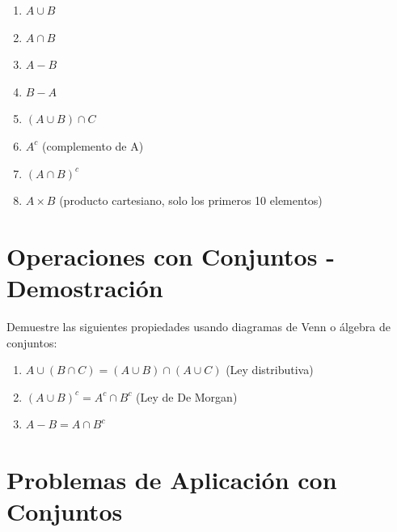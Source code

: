 \documentclass[12pt,a4paper]{article}
\begin{document}
\begin{enumerate}
    \item $A \cup B$
    \item $A \cap B$
    \item $A - B$
    \item $B - A$
    \item $(A \cup B) \cap C$
    \item $A^c$ (complemento de A)
    \item $(A \cap B)^c$
    \item $A \times B$ (producto cartesiano, solo los primeros 10 elementos)
\end{enumerate}

\section{Operaciones con Conjuntos - Demostración}
Demuestre las siguientes propiedades usando diagramas de Venn o álgebra de conjuntos:

\begin{enumerate}
    \item $A \cup (B \cap C) = (A \cup B) \cap (A \cup C)$ (Ley distributiva)
    \item $(A \cup B)^c = A^c \cap B^c$ (Ley de De Morgan)
    \item $A - B = A \cap B^c$
\end{enumerate}

\section{Problemas de Aplicación con Conjuntos}
\end{document}
